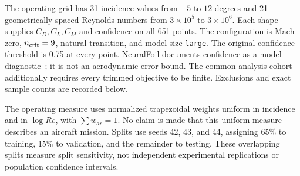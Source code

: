 \documentclass[11pt,a4paper]{article}
\begin{document}
The operating grid has 31 incidence values from $-5$ to $12$ degrees and 21 geometrically spaced Reynolds numbers from $3\times10^5$ to $3\times10^6$. Each shape supplies $C_D,C_L,C_M$ and confidence on all 651 points. The configuration is Mach zero, $n_{\rm crit}=9$, natural transition, and model size \texttt{large}. The original confidence threshold is 0.75 at every point. NeuralFoil documents confidence as a model diagnostic\ \cite{neuralfoil}; it is not an aerodynamic error bound. The common analysis cohort additionally requires every trimmed objective to be finite. Exclusions and exact sample counts are recorded below.

The operating measure uses normalized trapezoidal weights uniform in incidence and in $\log Re$, with $\sum w_{ar}=1$. No claim is made that this uniform measure describes an aircraft mission. Splits use seeds 42, 43, and 44, assigning 65\% to training, 15\% to validation, and the remainder to testing. These overlapping splits measure split sensitivity, not independent experimental replications or population confidence intervals.
\end{document}
